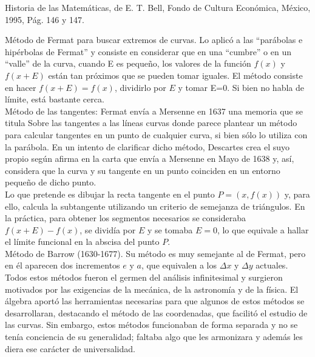 \documentclass[10pt,twoside]{SelfArx} %
\begin{document}
 Historia de las Matemáticas, de E. T. Bell, Fondo de
Cultura Económica, México, 1995, Pág. 146 y 147. 

Método de Fermat para buscar extremos de curvas. Lo aplicó a las 
“parábolas e hipérbolas de Fermat” y consiste en considerar que en una
“cumbre” o en un “valle” de la curva, cuando E es pequeño, los valores de la función $ f(x) $ y $ f(x+E) $ están tan próximos que se pueden tomar iguales. El método consiste en hacer $ f(x+E)=f(x) $, dividirlo por $ E $ y tomar E=0. Si bien no habla de límite, está bastante cerca. \\
Método de las tangentes:
 Fermat envía a Mersenne en 1637 una memoria que se titula Sobre las tangentes a las líneas curvas donde parece plantear un método para calcular tangentes en un punto de cualquier curva, si bien sólo lo utiliza con la parábola. En un intento de clarificar dicho método, Descartes crea el suyo propio según afirma en la carta que envía a Mersenne en Mayo de 1638 y, así, considera que la curva y su tangente en un punto coinciden en un entorno pequeño de dicho punto.\\
  Lo que pretende es dibujar la recta tangente en el punto $  P=(x,f(x)) $ y, para ello, calcula la subtangente  utilizando un criterio de semejanza de triángulos. En la práctica, para obtener los segmentos necesarios se consideraba $ f(x+E)-f(x) $, se dividía por $ E $ y se tomaba $ E=0 $, lo que equivale a hallar el límite funcional en la abscisa del punto $ P $.\\
Método de Barrow (1630-1677). Su método es muy semejante al de
Fermat, pero en él aparecen dos incrementos $ e $ y $ a $, que equivalen a los $ \Delta x $  y 
$ \Delta y $ actuales. \\
Todos estos métodos fueron el germen del análisis infinitesimal y surgieron motivados por las exigencias de la mecánica, de la astronomía y de la física. El álgebra aportó las herramientas necesarias para que algunos de estos métodos se desarrollaran, destacando el método de las coordenadas, que facilitó el estudio de las curvas. Sin embargo, estos métodos funcionaban de forma separada y no se tenía conciencia de su generalidad; faltaba algo que les armonizara y además les diera ese carácter de universalidad.
\end{document}
